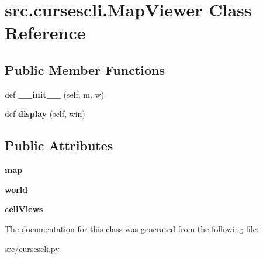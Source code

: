 \hypertarget{classsrc_1_1cursescli_1_1_map_viewer}{}\section{src.\+cursescli.\+Map\+Viewer Class Reference}
\label{classsrc_1_1cursescli_1_1_map_viewer}
\subsection*{Public Member Functions}
\begin{DoxyCompactItemize}
\item 
\hypertarget{classsrc_1_1cursescli_1_1_map_viewer_a83023ca29b6b44739ba96f0467f1585d}{}\label{classsrc_1_1cursescli_1_1_map_viewer_a83023ca29b6b44739ba96f0467f1585d} 
def {\bfseries \+\_\+\+\_\+init\+\_\+\+\_\+} (self, m, w)
\item 
\hypertarget{classsrc_1_1cursescli_1_1_map_viewer_aad5ff1c94191c8d240783d27c30adf29}{}\label{classsrc_1_1cursescli_1_1_map_viewer_aad5ff1c94191c8d240783d27c30adf29} 
def {\bfseries display} (self, win)
\end{DoxyCompactItemize}
\subsection*{Public Attributes}
\begin{DoxyCompactItemize}
\item 
\hypertarget{classsrc_1_1cursescli_1_1_map_viewer_a477a2477d14be79e73610dbb0690a29f}{}\label{classsrc_1_1cursescli_1_1_map_viewer_a477a2477d14be79e73610dbb0690a29f} 
{\bfseries map}
\item 
\hypertarget{classsrc_1_1cursescli_1_1_map_viewer_aadd96248cdfaf0673bdda4fea9f16c83}{}\label{classsrc_1_1cursescli_1_1_map_viewer_aadd96248cdfaf0673bdda4fea9f16c83} 
{\bfseries world}
\item 
\hypertarget{classsrc_1_1cursescli_1_1_map_viewer_a81bfe1d188b78c7426f9376251ee40b0}{}\label{classsrc_1_1cursescli_1_1_map_viewer_a81bfe1d188b78c7426f9376251ee40b0} 
{\bfseries cell\+Views}
\end{DoxyCompactItemize}


The documentation for this class was generated from the following file\+:\begin{DoxyCompactItemize}
\item 
src/cursescli.\+py\end{DoxyCompactItemize}
